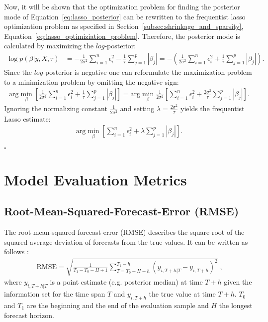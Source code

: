 Now, it will be shown that the optimization problem for finding the posterior mode of Equation~\eqref{eq:lasso_posterior} can be rewritten to the frequentist lasso optimization problem as specified in Section~\ref{subsec:shrinkage_and_sparsity}, Equation~\eqref{eq:lasso_optimiziation_problem}. Therefore, the posterior mode is calculated by maximizing the $log$-posterior:
\begin{align*}
    \log p(\beta|y , X , \tau) & = - \frac{1}{2 \sigma^2} \sum_{i = 1}^{n} \epsilon_i^2 - \frac{1}{\tau} \sum_{j = 1}^{p} |\beta_j| = - \left( \frac{1}{2 \sigma^2} \sum_{i = 1}^{n} \epsilon_i^2 + \frac{1}{\tau} \sum_{j = 1}^{p} |\beta_j| \right) \text{.}
\end{align*}
Since the $log$-posterior is negative one can reformulate the maximization problem to a minimization problem by omitting the negative sign:
\begin{align*}
    \text{arg} \min_{\beta} \left[ \frac{1}{2 \sigma^2} \sum_{i = 1}^{n} \epsilon_i^2 + \frac{1}{\tau} \sum_{j = 1}^{p} |\beta_j| \right] = \text{arg} \min_{\beta} \frac{1}{2 \sigma^2} \left[ \sum_{i = 1}^{n} \epsilon_i^2 + \frac{2 \sigma^2}{\tau} \sum_{j = 1}^{p} |\beta_j| \right] \text{.}
\end{align*}
Ignoring the normalizing constant $\frac{1}{2 \sigma^2}$ and setting $\lambda = \frac{2 \sigma^2}{\tau}$ yields the frequentist Lasso estimate:
\begin{align*}
    \text{arg} \min_{\beta} \left[ \sum_{i = 1}^{n} \epsilon_i^2 + \lambda \sum_{j = 1}^{p} |\beta_j| \right] \text{.}
\end{align*}

\hfill$\square$

\section{Model Evaluation Metrics}
\subsection{Root-Mean-Squared-Forecast-Error (RMSE)}
\label{app:rmse}
The root-mean-squared-forecast-error (RMSE) describes the square-root of the squared average deviation of forecasts from the true values. It can be written as follows \parencite{banbura_large_2010}:
\begin{align*}
    \text{RMSE} = \sqrt{\frac{1}{T_1 - T_0 - H + 1} \sum_{T = T_0 + H - h}^{T_1 - h} (y_{i , T + h | T} - y_{i , T + h})^2} \; \text{,}
\end{align*}
where $y_{i , T + h | T}$ is a point estimate (e.g. posterior median) at time $T + h$ given the information set for the time span $T$ and $y_{i , T + h}$ the true value at time $T + h$. $T_0$ and $T_1$ are the beginning and the end of the evaluation sample and $H$ the longest forecast horizon.

